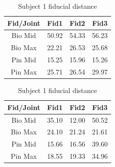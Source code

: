 \begin{table}
\begin{subtable}[c]{0.5\textwidth}
    \centering
        \begin{tabular}{||c | c c c||} 
         \hline
          Fid/Joint & Fid1 & Fid2 & Fid3  \\ [0.5ex] 
         \hline\hline
         Bio Mid & 50.92 & 54.33 & 56.23 \\ 
         \hline
         Bio Max & 22.21 & 26.53 & 25.68 \\
         \hline
         Pin Mid & 15.25 & 15.96 & 15.26 \\
         \hline
         Pin Max & 25.71 & 26.54 & 29.97 \\ [1ex] 
         \hline
        \end{tabular}
    \end{subtable}
   \begin{subtable}[c]{0.5\textwidth}
   \centering
    \begin{tabular}{||c | c c c||} 
         \hline
         Fid/Joint & Fid1 & Fid2 & Fid3  \\ [0.5ex] 
         \hline\hline
         Bio Mid & 35.10 & 12.00 & 50.52 \\ 
         \hline
         Bio Max & 24.10 & 21.24 & 21.61 \\
         \hline
         Pin Mid & 15.66 & 16.56 & 39.60 \\
         \hline
         Pin Max & 18.55 & 19.33 & 34.96 \\ [1ex] 
         \hline
        \end{tabular}
    \end{subtable}
\caption{Subject 1 fiducial distance}
\label{tab:sub1MRI}
\end{table}



